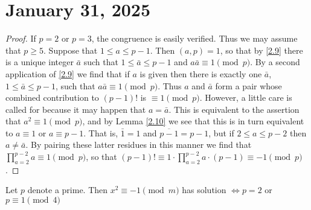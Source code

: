 \documentclass[11pt]{article}
\begin{document}
\section{January 31, 2025}
\begin{proof}
    If \(p = 2\) or \(p = 3\), the congruence is easily verified. Thus we may assume that \(p \geq 5\). Suppose that \(1 \leq a \leq p - 1\). Then \((a, p) = 1\), so that by \ref{2.9} there is a unique integer \(\bar{a}\) such that \(1 \leq \bar{a} \leq p - 1\) and \(a\bar{a} \equiv 1 \pmod{p}\). By a second application of \ref{2.9} we find that if \(a\) is given then there is exactly one \(\bar{a}\), \(1 \leq \bar{a} \leq p - 1\), such that \(a\bar{a} \equiv 1 \pmod{p}\). Thus \(a\) and \(\bar{a}\) form a pair whose combined contribution to \((p - 1)!\) is \(\equiv 1 \pmod{p}\). However, a little care is called for because it may happen that \(a = \bar{a}\). This is equivalent to the assertion that \(a^2 \equiv 1 \pmod{p}\), and by Lemma \ref{2.10} we see that this is in turn equivalent to \(a \equiv 1\) or \(a \equiv p - 1\). That is, \(\bar{1} = 1\) and \(\overline{p - 1} = p - 1\), but if \(2 \leq a \leq p - 2\) then \(a \neq \bar{a}\). By pairing these latter residues in this manner we find that \(\prod_{a=2}^{p-2} a \equiv 1 \pmod{p}\), so that \((p - 1)! \equiv 1 \cdot \prod_{a=2}^{p-2} a \cdot (p - 1) \equiv -1 \pmod{p}\).
\end{proof}
\begin{theorem}\label{2.12}
    Let \(p\) denote a prime. Then \(x^2 \equiv -1 \pmod {m}\) has solution \(\Longleftrightarrow p = 2\) or \(p \equiv 1 \pmod{4}\)
\end{theorem}
\end{document}
